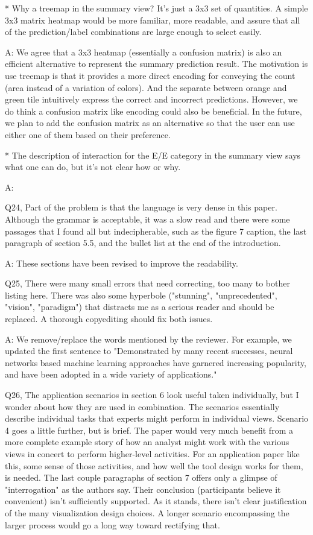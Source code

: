 * Why a treemap in the summary view? It's just a 3x3 set of quantities. A simple 3x3 matrix heatmap would be more familiar, more readable, and assure that all of the prediction/label combinations are large enough to select easily.

A: We agree that a 3x3 heatmap (essentially a confusion matrix) is also an efficient alternative to represent the summary prediction result. The motivation is use treemap is that it provides a more direct encoding for conveying the count (area instead of a variation of colors). And the separate between orange and green tile intuitively express the correct and incorrect predictions. However, we do think a confusion matrix like encoding could also be beneficial. In the future, we plan to add the confusion matrix as an alternative so that the user can use either one of them based on their preference.

* The description of interaction for the E/E category in the summary view says what one can do, but it's not clear how or why.

A:

Q24, Part of the problem is that the language is very dense in this paper. Although the grammar is acceptable, it was a slow read and there were some passages that I found all but indecipherable, such as the figure 7 caption, the last paragraph of section 5.5, and the bullet list at the end of the introduction.

A: These sections have been revised to improve the readability.

Q25, There were many small errors that need correcting, too many to bother listing here. There was also some hyperbole ("stunning", "unprecedented", "vision", "paradigm") that distracts me as a serious reader and should be replaced. A thorough copyediting should fix both issues.

A: We remove/replace the words mentioned by the reviewer. For example, we updated the first sentence to "Demonstrated by many recent successes, neural networks based machine learning approaches have garnered increasing popularity, and have been adopted in a wide variety of applications."


Q26, The application scenarios in section 6 look useful taken individually, but I wonder about how they are used in combination. The scenarios essentially describe individual tasks that experts might perform in individual views. Scenario 4 goes a little further, but is brief. The paper would very much benefit from a more complete example story of how an analyst might work with the various views in concert to perform higher-level activities. For an application paper like this, some sense of those activities, and how well the tool design works for them, is needed. The last couple paragraphs of section 7 offers only a glimpse of "interrogation" as the authors say.
Their conclusion (participants believe it convenient) isn't sufficiently supported. As it stands, there isn't clear justification of the many visualization design choices. A longer scenario encompassing the larger process would go a long way toward rectifying that.

